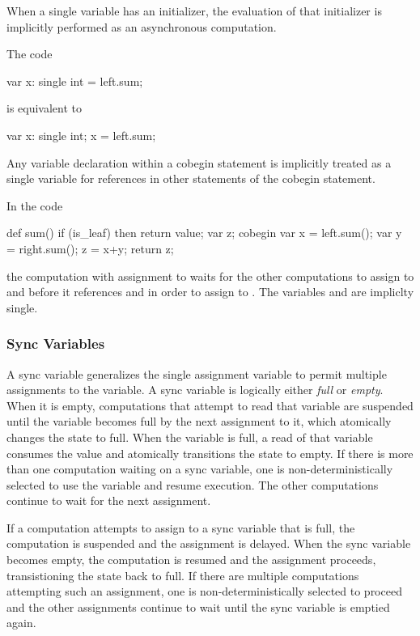 When a single variable has an initializer, the evaluation of
that initializer is implicitly performed as an asynchronous computation. 
\begin{example}
The code
\begin{chapel}
var x: single int = left.sum;
\end{chapel}
is equivalent to
\begin{chapel}
var x: single int;
x = left.sum;
\end{chapel}
\end{example}

Any variable declaration within a cobegin statement is implicitly
treated as a single variable for references in other statements of the
cobegin statement.
\begin{example}
In the code
\begin{chapel}
def sum() {
  if (is_leaf) then 
    return value;
  var z;
  cobegin {
    var x = left.sum();
    var y = right.sum();
    z = x+y;
  }
  return z;
}
\end{chapel}
the computation with assignment to  waits for the other
computations to assign to  and  before it
references  and  in order to assign to .  The
variables  and  are impliclty single.
\end{example}

\subsubsection{Sync Variables}
\label{Sync_Variables}

A sync variable generalizes the single assignment variable to permit
multiple assignments to the variable. A sync variable is logically
either {\em full} or {\em empty}. When it is empty, computations that
attempt to read that variable are suspended until the variable becomes
full by the next assignment to it, which atomically changes the state
to full. When the variable is full, a read of that variable consumes
the value and atomically transitions the state to empty. If there is
more than one computation waiting on a sync variable, one is
non-deterministically selected to use the variable and resume
execution.  The other computations continue to wait for the next
assignment.

If a computation attempts to assign to a sync variable that is full,
the computation is suspended and the assignment is delayed. When the
sync variable becomes empty, the computation is resumed and the
assignment proceeds, transistioning the state back to full. If there
are multiple computations attempting such an assignment, one is
non-deterministically selected to proceed and the other assignments
continue to wait until the sync variable is emptied again.

